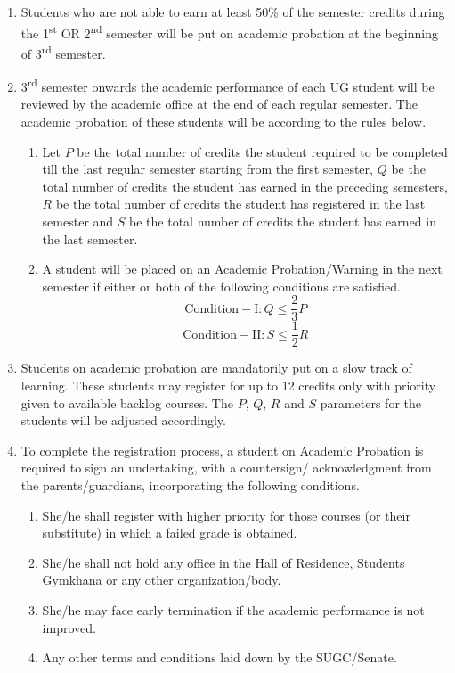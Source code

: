 \begin{enumerate}[leftmargin=15mm]
    \item Students who are not able to earn at least 50\% of the semester credits during the 1\textsuperscript{st} OR 2\textsuperscript{nd} semester will be put on academic probation at the beginning of 3\textsuperscript{rd} semester.
    \item 3\textsuperscript{rd} semester onwards the academic performance of each UG student will be reviewed by the academic office at the end of each regular semester. The academic probation of these students will be according to the rules below.

    \begin{enumerate}
        \item Let $P$ be the total number of credits the student required to be completed till the last regular semester starting from the first semester, $Q$ be the total number of credits the student has earned in the preceding semesters, $R$ be the total number of credits the student has registered in the last semester and $S$ be the total number of credits the student has earned in the last semester.
        \item A student will be placed on an Academic Probation/Warning in the next semester if either or both of the following conditions are satisfied.
    \begin{equation}
        \mathrm{Condition-I} : Q \leq \frac{2}{3}P
        \end{equation}
    \begin{equation}
        \mathrm{Condition-II} : S\leq \frac{1}{2}R
    \end{equation}
        
    \end{enumerate}

    \item Students on academic probation are mandatorily put on a slow track of learning. These students may register for up to 12 credits only with priority given to available backlog courses. The  $P$, $Q$, $R$ and $S$ parameters for the students will be adjusted accordingly.
    \item To complete the registration process, a student on Academic Probation is required to sign an undertaking, with a countersign/ acknowledgment from the parents/guardians, incorporating the following conditions. 

    \begin{enumerate}
        \item She/he shall register with higher priority for those courses (or their substitute) in which a failed grade is obtained.
        \item She/he shall not hold any office in the Hall of Residence, Students Gymkhana or any other organization/body.
        \item She/he may face early termination if the academic performance is not improved.
        \item Any other terms and conditions laid down by the SUGC/Senate.
    \end{enumerate}


\end{enumerate}

